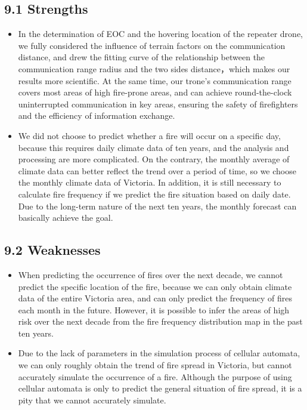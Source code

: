 \documentclass{mcmthesis}
\begin{document}
\subsection*{9.1 Strengths}
\begin{itemize}
  \item In the determination of EOC and the hovering location of the repeater drone, we fully considered the influence of terrain factors on the communication distance, and drew the fitting curve of the relationship between the communication range radius and the two sides distance，which makes our results more scientific. At the same time, our trone's communication range covers most areas of high fire-prone areas, and can achieve round-the-clock uninterrupted communication in key areas, ensuring the safety of firefighters and the efficiency of information exchange.

  \item We did not choose to predict whether a fire will occur on a specific day, because this requires daily climate data of ten years, and the analysis and processing are more complicated. On the contrary, the monthly average of climate data can better reflect the trend over a period of time, so we choose the monthly climate data of Victoria. In addition, it is still necessary to calculate fire frequency if we predict the fire situation based on daily date. Due to the long-term nature of the next ten years, the monthly forecast can basically achieve the goal. 
\end{itemize}
\subsection*{9.2 Weaknesses}
\begin{itemize}
  \item When predicting the occurrence of fires over the next decade, we cannot predict the specific location of the fire, because we can only obtain climate data of the entire Victoria area, and can only predict the frequency of fires each month in the future. However, it is possible to infer the areas of high risk over the next decade from the fire frequency distribution map in the past ten years.

  \item Due to the lack of parameters in the simulation process of cellular automata, we can only roughly obtain the trend of fire spread in Victoria, but cannot accurately simulate the occurrence of a fire. Although the purpose of using cellular automata is only to predict the general situation of fire spread, it is a pity that we cannot accurately simulate.
\end{itemize}
\end{document}
